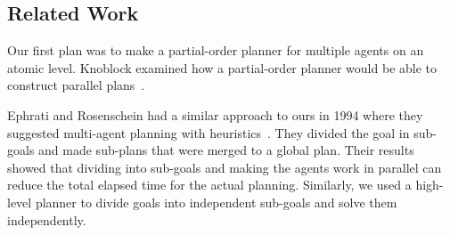 \subsection{Related Work}
\label{sec:related work}
Our first plan was to make a partial-order planner for multiple agents on an atomic level.
Knoblock examined how a partial-order planner would be able to construct parallel plans~\cite{knoblock1994generating}.

Ephrati and Rosenschein had a similar approach to ours in 1994 where they suggested multi-agent planning with heuristics~\cite{ephrati1994divide}.
They divided the goal in sub-goals and made sub-plans that were merged to a global plan.
Their results showed that dividing into sub-goals and making the agents work in parallel can reduce the total elapsed time for the actual planning.
Similarly, we used a high-level planner to divide goals into independent sub-goals and solve them independently.




